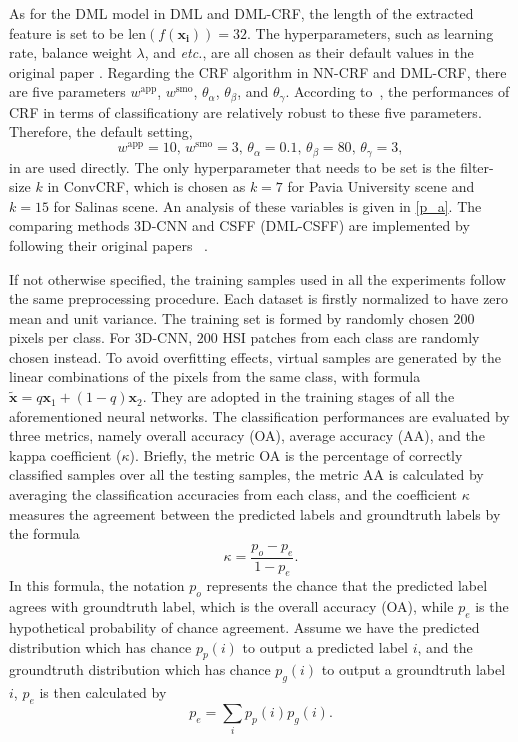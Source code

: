 \documentclass[]{article}
\newcommand{\red}{\color{black}}
\newcommand{\magentaso}{\color{black}}
\newcommand{\orangesso}{\color{black}}
\begin{document}
As for the DML model in DML and DML-CRF, the length of the extracted feature is set to be 
$\mathrm{len}(f(\mathbf{x_i})) = 32$. 
The hyperparameters, such as learning rate, balance weight $\lambda$, and {\em etc.}, 
are all chosen as {\magentaso their default values in the original paper \cite{guo2017spectral}}.
Regarding the CRF algorithm in NN-CRF and DML-CRF, there are five parameters 
$w^{\mathrm{app}}$, $w^{\mathrm{smo}}$,
$\theta_\alpha$, $\theta_\beta$, and $\theta_\gamma$.
According to~\cite{krahenbuhl2011efficient},
the performances of CRF in terms of
classificationy are {\red relatively} robust to these five parameters. Therefore, the default setting,
\[
w^{\mathrm{app}} = 10,\, w^{\mathrm{smo}} = 3,\, \theta_\alpha = 0.1,\, \theta_\beta = 80,\, \theta_\gamma = 3,
\]
in \cite{krahenbuhl2011efficient,teichmann2018convolutional} are used directly.
The only hyperparameter {\magentaso that needs} to be set is the filter-size $k$ in ConvCRF, which is chosen as $k = 7$ for Pavia University scene and
$k=15$ for Salinas scene.
{\red An analysis of these variables is given in \cref{p_a}.}
The comparing methods $3$D-CNN and CSFF (DML-CSFF) are implemented by following 
{\magentaso their original papers }~\cite{chen2016deep,guo2018cnn}.


If not otherwise specified, the training samples used in all the experiments 
follow the same preprocessing procedure.
Each dataset is firstly normalized to have zero mean and unit variance. 
The training set is formed by randomly chosen $200$ pixels per class.
For $3$D-CNN, $200$ HSI patches from each class are randomly chosen instead.
To avoid overfitting effects, virtual samples are generated {\magentaso by the linear combinations of the pixels from the same class, 
with formula}
$\tilde{\mathbf{x}} = q\mathbf{x}_1 + (1-q)\mathbf{x}_2.$
{\magentaso They are adopted in the training stages of all the aforementioned neural networks.}
The classification {\magentaso performances are} evaluated by three metrics, namely overall accuracy (OA), 
average accuracy (AA), and the kappa coefficient ($\kappa$).
{\orangesso Briefly, the metric OA is the percentage of correctly classified samples over all the 
testing samples, 
the metric AA is calculated by averaging the classification accuracies from each class, 
and the coefficient $\kappa$ 
measures the agreement between the predicted labels and groundtruth labels by the formula
\[
	\kappa = \frac{p_o-p_e}{1-p_e}.	
\]
In this formula, the notation $p_o$ represents the chance that the predicted label agrees with groundtruth label, 
which is the overall accuracy (OA), while $p_e$ is the hypothetical probability of chance agreement. 
Assume we have the predicted distribution which has chance $p_p(i)$ to output a predicted label $i$, 
and the groundtruth distribution 
which has chance $p_g(i)$ to output a groundtruth label $i$, $p_e$ is then calculated by 
\[
	p_e = \sum_{i} p_p(i)p_g(i).	
\]}
\end{document}
